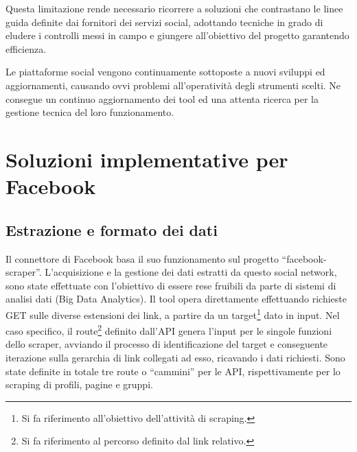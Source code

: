 Questa limitazione rende necessario ricorrere a soluzioni che contrastano le linee guida definite dai fornitori dei servizi social, adottando tecniche in grado di eludere i controlli messi in campo e giungere all'obiettivo del progetto garantendo efficienza.

Le piattaforme social vengono continuamente sottoposte a nuovi sviluppi ed aggiornamenti, causando ovvi problemi all'operativit\`a degli strumenti scelti. Ne consegue un continuo aggiornamento dei tool ed una attenta ricerca per la  gestione tecnica del loro funzionamento.

\section{Soluzioni implementative per Facebook}
\subsection{Estrazione e formato dei dati}
Il connettore di Facebook basa il suo funzionamento sul progetto ``facebook-scraper''.
L'acquisizione e la gestione dei dati estratti da questo social network, sono state effettuate con l'obiettivo di essere rese fruibili da parte di sistemi di analisi dati (Big Data Analytics).
Il tool opera direttamente effettuando richieste GET sulle diverse estensioni dei link, a partire da un target\footnote{Si fa riferimento all'obiettivo dell'attivit\`a di scraping.} dato in input.
Nel caso specifico, il route\footnote{Si fa riferimento al percorso definito dal link relativo.} definito dall'API genera l'input per le singole funzioni dello scraper, avviando il processo di identificazione del target e conseguente iterazione sulla gerarchia di link collegati ad esso, ricavando i dati richiesti.
Sono state definite in totale tre route o ``cammini'' per le API, rispettivamente per lo scraping di profili, pagine e gruppi.

